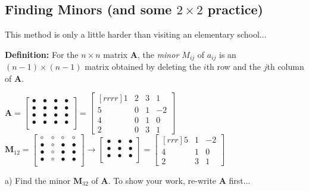 \documentclass{article}
\begin{document}
\begin{flushleft}
\begin{center}
\section{Finding Minors (and some $2 \times 2$ practice)}
\small This method is only a little harder than visiting an elementary school... \normalsize
\end{center}
\textbf{Definition:} For the $n \times n$ matrix \textbf{A}, the \textit{minor $M_{ij}$} of $a_{ij}$ is an $(n-1) \times (n-1)$ matrix obtained by deleting the $i$th row and the $j$th column of \textbf{A}. \\
\begin{center}
$\textbf{A}=
\begin{bmatrix}
\bullet &\bullet &\bullet & \bullet \\
\bullet &\bullet &\bullet & \bullet \\
\bullet &\bullet &\bullet & \bullet \\
\bullet &\bullet &\bullet & \bullet \\
\end{bmatrix}
=
\begin{bmatrix}[rrrr]
1&2&3&1\\
5&0&1&-2\\
4&0&1&0\\
2&0&3&1
\end{bmatrix}
$
\hspace{0.4in}
$\textbf{M}_{12}=
\begin{bmatrix}
\circ & \circ & \circ & \circ \\
\bullet & \circ & \bullet & \bullet \\
\bullet & \circ & \bullet & \bullet \\
\bullet & \circ & \bullet & \bullet \\
\end{bmatrix}
\rightarrow
\begin{bmatrix}
\bullet & \bullet & \bullet \\
\bullet & \bullet & \bullet \\
\bullet & \bullet & \bullet \\
\end{bmatrix}
=
\begin{bmatrix}[rrr]
5 & 1&-2\\
4 & 1& 0\\
2&3&1
\end{bmatrix}$
\end{center}
a) Find the minor $\textbf{M}_{32}$ of \textbf{A}. To show your work, re-write \textbf{A} first...\\

\end{flushleft}
\end{document}
